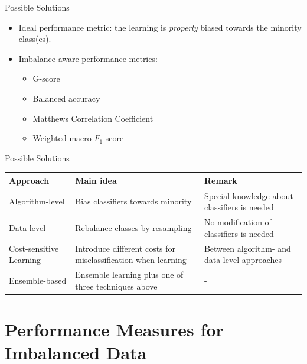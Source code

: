 \documentclass[11pt,compress,t,notes=noshow, aspectratio=169, xcolor=table]{beamer}
\begin{document}
\begin{frame}{Possible Solutions}
	\begin{itemize}
        
		\item Ideal performance metric: the learning is \emph{properly} biased towards the minority class(es).	

        \item Imbalance-aware performance metrics:
        \begin{itemize}
            \item G-score
            \item Balanced accuracy
            \item Matthews Correlation Coefficient
            \item Weighted macro $F_1$ score
        \end{itemize}
	\end{itemize}
\end{frame} 


\begin{frame}{Possible Solutions}
\begin{table}[h]
\footnotesize
    \centering
    \begin{tabular}{p{} p{} p{}}
        \toprule
        \textbf{Approach} & \textbf{Main idea} & \textbf{Remark} \\ [5pt]
        \hline
        Algorithm-level & Bias classifiers towards minority & Special knowledge about classifiers is needed \\ [5pt]
        \hline
        Data-level & Rebalance classes by resampling & No modification of classifiers is needed \\ [5pt]
        \hline
        Cost-sensitive Learning & Introduce different costs for misclassification when learning & Between algorithm- and data-level approaches \\ [15pt]
        \hline
        Ensemble-based & Ensemble learning plus one of three techniques above & - \\ [5pt]
        \bottomrule
    \end{tabular}
\end{table}

\end{frame}


\section{Performance Measures for Imbalanced Data}
\end{document}

